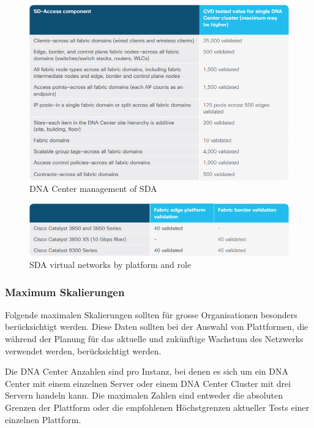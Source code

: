 \begin{figure}[H]
	\centering
	\includegraphics[width=1\linewidth]{img/Analyse/CVD-DNACmanagementofSDA-1-2-5}
	\caption{DNA Center management of SDA \cite{sda-designguide-sept2018}}
	\label{fig:DNA Center management of SDA}
\end{figure}


\begin{figure}[H]
	\centering
	\includegraphics[width=1\linewidth]{img/Analyse/CVD-SDAvirtualnetworksbyplatformandrole-1-2-5}
	\caption{SDA virtual networks by platform and role \cite{sda-designguide-sept2018}}
	\label{fig:SDA virtual networks by platform and role}
\end{figure}


\subsubsection{Maximum Skalierungen}
Folgende maximalen Skalierungen sollten für grosse Organisationen besonders berücksichtigt werden. Diese Daten sollten bei der Auswahl von Plattformen, die während der Planung für das aktuelle und zukünftige Wachstum des Netzwerks verwendet werden, berücksichtigt werden.

Die DNA Center Anzahlen sind pro Instanz, bei denen es sich um ein DNA Center mit einem einzelnen Server oder einem DNA Center Cluster mit drei Servern handeln kann. Die maximalen Zahlen sind entweder die absoluten Grenzen der Plattform oder die empfohlenen Höchstgrenzen aktueller Tests einer einzelnen Plattform.


